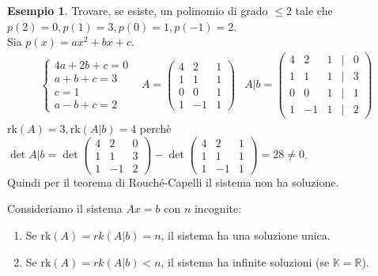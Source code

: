 \documentclass[a4paper]{article}
\theoremstyle{definition}
\newtheorem*{es}{Esempio}
\begin{document}
	\begin{es}
		Trovare, se esiste, un polinomio di grado $\le 2$ tale che $p(2) = 0, p(1) = 3, p(0) = 1, p(-1) = 2$. \\
		Sia $p(x) = ax^2 + bx + c$.
		\begin{align*}
			\begin{cases}
				4a + 2b + c = 0 \\
				a + b + c = 3 \\
				c = 1 \\
				a - b + c = 2
			\end{cases} & A = \begin{pmatrix}
				4 & 2 & 1 \\
				1 & 1 & 1 \\
				0 & 0 & 1 \\
				1 & -1 & 1
			\end{pmatrix} &
			A|b = \begin{pmatrix}
				4 & 2 & 1 & \mid & 0 \\
				1 & 1 & 1 & \mid & 3 \\
				0 & 0 & 1 & \mid & 1 \\
				1 & -1 & 1 & \mid & 2
			\end{pmatrix}
		\end{align*}
		$\text{rk}(A) = 3, \text{rk}(A|b) = 4$ perchè $\det A|b = \det \begin{pmatrix}
			4 & 2 & 0 \\
			1 & 1 & 3 \\
			1 & -1 & 2
		\end{pmatrix} - \det \begin{pmatrix}
			4 & 2 & 1 \\
			1 & 1 & 1 \\
			1 & -1 & 1
		\end{pmatrix} = 28 \ne 0$. \\
		Quindi per il teorema di Rouché-Capelli il sistema non ha soluzione.
	\end{es}
	\begin{teo}{}{}
		Consideriamo il sistema $Ax = b$ con $n$ incognite:
		\begin{enumerate}
			\item Se $\text{rk}(A) = rk(A|b) = n$, il sistema ha una soluzione unica.
			\item Se $\text{rk}(A) = rk(A|b) < n$, il sistema ha infinite soluzioni (se $\mathbb{K} = \mathbb{R}$).
		\end{enumerate}
	\end{teo}
\end{document}
